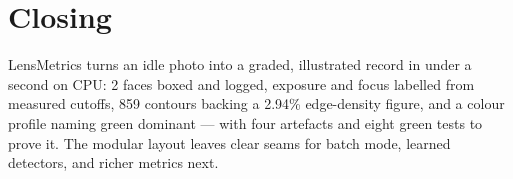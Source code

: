 \documentclass[11pt,a4paper]{article}
\begin{document}
\section{Closing}
LensMetrics turns an idle photo into a graded, illustrated record in under a
second on CPU: 2 faces boxed and logged, exposure and focus labelled from
measured cutoffs, 859 contours backing a 2.94\% edge-density figure, and a
colour profile naming green dominant --- with four artefacts and eight green
tests to prove it. The modular layout leaves clear seams for batch mode,
learned detectors, and richer metrics next.
\end{document}
